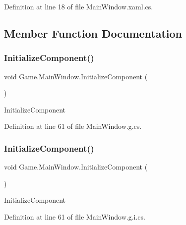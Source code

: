 Definition at line 18 of file Main\+Window.\+xaml.\+cs.



\subsection{Member Function Documentation}
\mbox{\label{class_game_1_1_main_window_adfb69762c50d8d3d7c1e3c2df69c4281}} 
\subsubsection{\texorpdfstring{InitializeComponent()}{InitializeComponent()}\hspace{0.1cm}{\footnotesize\ttfamily [1/2]}}
{\footnotesize\ttfamily void Game.\+Main\+Window.\+Initialize\+Component (\begin{DoxyParamCaption}{ }\end{DoxyParamCaption})}



Initialize\+Component 



Definition at line 61 of file Main\+Window.\+g.\+cs.

\mbox{\label{class_game_1_1_main_window_adfb69762c50d8d3d7c1e3c2df69c4281}} 
\subsubsection{\texorpdfstring{InitializeComponent()}{InitializeComponent()}\hspace{0.1cm}{\footnotesize\ttfamily [2/2]}}
{\footnotesize\ttfamily void Game.\+Main\+Window.\+Initialize\+Component (\begin{DoxyParamCaption}{ }\end{DoxyParamCaption})}



Initialize\+Component 



Definition at line 61 of file Main\+Window.\+g.\+i.\+cs.



